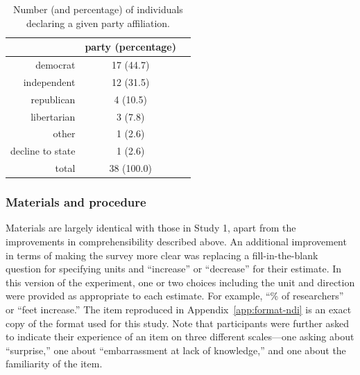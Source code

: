 \begin{table}[ht]
    \caption{Number (and percentage) of individuals declaring a given party
        affiliation.}
    \label{table:CCO-ndi-party}
\centering
\begin{tabular}{rcc}
  \toprule
      & party (percentage) \\ 
  \midrule
  democrat &  17 (44.7) \\ 
  independent &  12 (31.5) \\ 
  republican &   4 (10.5) \\ 
  libertarian &   3 (7.8) \\ 
  other &   1 (2.6) \\ 
  decline to state &   1 (2.6) \\ 
  \midrule
  total &  38 (100.0) \\ 
   \bottomrule
\end{tabular}
\end{table}


\subsubsection{Materials and procedure}

Materials are largely identical with those in Study 1, apart from the
improvements in comprehensibility described above. An additional improvement in
terms of making the survey more clear was replacing a fill-in-the-blank question
for specifying units and “increase” or “decrease” for their estimate. In this
version of the experiment, one or two choices including the unit and direction
were provided as appropriate to each estimate. For example, “\% of researchers”
or “feet increase.” The item reproduced in Appendix~\ref{app:format-ndi} is an
exact copy of the format used for this study.  Note that participants were
further asked to indicate their experience of an item on three different
scales---one asking about “surprise,” one about “embarrassment at lack of
knowledge,” and one about the familiarity of the item.

